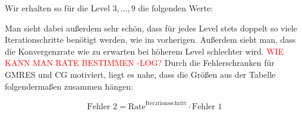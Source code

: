 \documentclass[12pt,a4paper]{scrartcl}
\numberwithin{equation}{section}
\begin{document}
\begin{figure}[H]
	\centering
\end{figure}

Wir erhalten so für die Level $3, \dots,9$ die folgenden Werte:

\begin{figure}[H]
	\centering
\end{figure}

Man sieht dabei außerdem sehr schön, dass für jedes Level stets doppelt so viele Iterationschritte benötigt werden, wie im vorherigen. Außerdem sieht man, dass die Konvergenzrate wie zu erwarten bei höherem Level schlechter wird. 
\textcolor{red}{WIE KANN MAN RATE BESTIMMEN -LOG?}
Durch die Fehlerschranken für GMRES und CG motiviert, liegt es nahe, dass die Größen aus der Tabelle folgendermaßen zusammen hängen:

\[\text{Fehler 2}= \text{Rate}^{\text{Iterationsschritt}} \cdot \text{Fehler 1}\]
\end{document}
